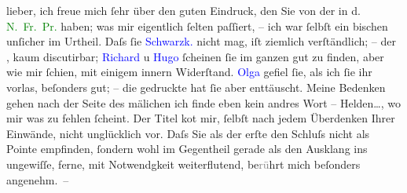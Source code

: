 \pstart
           lieber, ich freue mich ſehr über den guten Eindruck, den Sie von der
                  \label{K_L02974-1v}\label{K_L02974-1h} in d. \textcolor{green}{N. Fr. Pr.}{}\ledrightnote{\textcolor{green}{Neue Freie Presse}} haben; was mir
               eigentlich ſelten paſſiert, – ich war ſelbſt ein bischen unſicher im Urtheil. Daſs
               ſie \textcolor{blue}{Schwarzk.}{}\ledrightnote{\textcolor{blue}{Gustav Schwarzkopf}} nicht mag, iſt ziemlich
               verſtändlich; – der \label{K_L02974-2v}\label{K_L02974-2h}, kaum discutirbar; \textcolor{blue}{Richard}{}\ledrightnote{\textcolor{blue}{Richard Beer-Hofmann}} u \textcolor{blue}{Hugo}{}\ledrightnote{\textcolor{blue}{Hugo von Hofmannsthal}} ſcheinen ſie im ganzen gut zu finden, aber
                  {\pb}wie mir ſchien, mit einigem innern
               Widerſtand. \textcolor{blue}{Olga}{}\ledrightnote{\textcolor{blue}{Olga Schnitzler}} gefiel ſie, als ich ſie ihr
               vorlas, beſonders gut; – die gedruckte hat ſie aber enttäuscht. Meine Bedenken gehen
               nach der Seite des mä\textcolor{gray}{{\geminationn}}lichen {\dotstwo} ich f\textcolor{gray}{i}nde eben kein
               andres Wort – Helden{\dots}, wo mir was zu fehlen ſcheint. Der
               Titel ko{\geminationm}t mir, ſelbſt nach jedem Überdenken Ihrer
               Einwände, nicht un{\pb}glücklich vor. Daſs Sie
               als der erſte den Schluſs nicht als Pointe empfinden, ſondern wohl im Gegentheil
               gerade als den Ausklang ins ungewiſſe, ferne, mit Notwendgkeit weiterflutend,
                  be\textcolor{gray}{rü}hrt mich beſonders angenehm. –\pend
           
